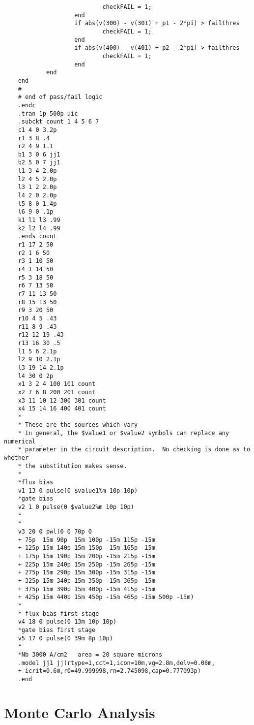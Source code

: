 \begin{verbatim}
                            checkFAIL = 1;
                    end
                    if abs(v(300) - v(301) + p1 - 2*pi) > failthres
                            checkFAIL = 1;
                    end
                    if abs(v(400) - v(401) + p2 - 2*pi) > failthres
                            checkFAIL = 1;
                    end
            end
    end
    #
    # end of pass/fail logic
    .endc
    .tran 1p 500p uic
    .subckt count 1 4 5 6 7
    c1 4 0 3.2p
    r1 3 8 .4
    r2 4 9 1.1
    b1 3 0 6 jj1
    b2 5 0 7 jj1
    l1 3 4 2.0p
    l2 4 5 2.0p
    l3 1 2 2.0p
    l4 2 0 2.0p
    l5 8 0 1.4p
    l6 9 0 .1p
    k1 l1 l3 .99
    k2 l2 l4 .99
    .ends count
    r1 17 2 50
    r2 1 6 50
    r3 1 10 50
    r4 1 14 50
    r5 3 18 50
    r6 7 13 50
    r7 11 13 50
    r8 15 13 50
    r9 3 20 50
    r10 4 5 .43
    r11 8 9 .43
    r12 12 19 .43
    r13 16 30 .5
    l1 5 6 2.1p
    l2 9 10 2.1p
    l3 19 14 2.1p
    l4 30 0 2p
    x1 3 2 4 100 101 count
    x2 7 6 8 200 201 count
    x3 11 10 12 300 301 count
    x4 15 14 16 400 401 count
    *
    * These are the sources which vary
    * In general, the $value1 or $value2 symbols can replace any numerical
    * parameter in the circuit description.  No checking is done as to whether
    * the substitution makes sense.
    *
    *flux bias
    v1 13 0 pulse(0 $value1%m 10p 10p)
    *gate bias
    v2 1 0 pulse(0 $value2%m 10p 10p)
    *
    *
    v3 20 0 pwl(0 0	70p 0
    + 75p  15m 90p  15m 100p -15m 115p -15m 
    + 125p 15m 140p 15m 150p -15m 165p -15m
    + 175p 15m 190p 15m 200p -15m 215p -15m
    + 225p 15m 240p 15m 250p -15m 265p -15m
    + 275p 15m 290p 15m 300p -15m 315p -15m
    + 325p 15m 340p 15m 350p -15m 365p -15m
    + 375p 15m 390p 15m 400p -15m 415p -15m
    + 425p 15m 440p 15m 450p -15m 465p -15m 500p -15m)
    *
    * flux bias first stage
    v4 18 0 pulse(0 13m 10p 10p)
    *gate bias first stage
    v5 17 0 pulse(0 39m 8p 10p)
    *
    *Nb 3000 A/cm2   area = 20 square microns
    .model jj1 jj(rtype=1,cct=1,icon=10m,vg=2.8m,delv=0.08m,
    + icrit=0.6m,r0=49.999998,rn=2.745098,cap=0.777093p)
    .end
\end{verbatim}


\section{Monte Carlo Analysis}


